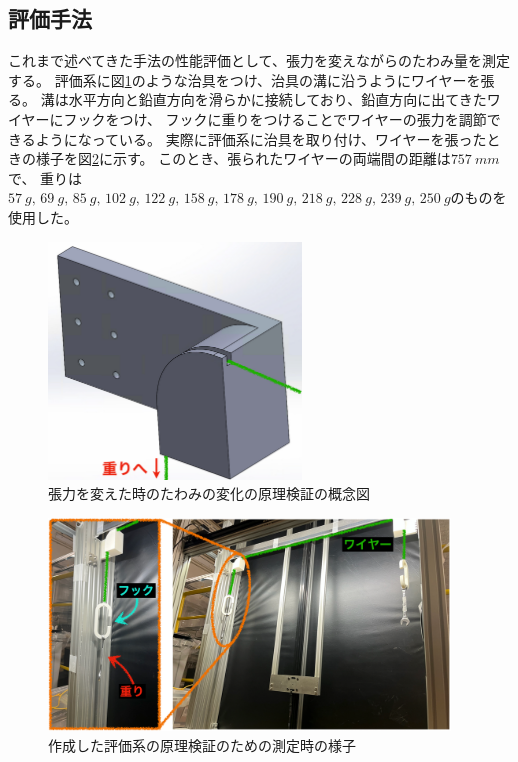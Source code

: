 \documentclass[../../main.tex]{subfiles}
\begin{document}
\subsection{評価手法}
これまで述べてきた手法の性能評価として、張力を変えながらのたわみ量を測定する。
評価系に図\ref{fig:wiresag_performance_zig}のような治具をつけ、治具の溝に沿うようにワイヤーを張る。
溝は水平方向と鉛直方向を滑らかに接続しており、鉛直方向に出てきたワイヤーにフックをつけ、
フックに重りをつけることでワイヤーの張力を調節できるようになっている。
実際に評価系に治具を取り付け、ワイヤーを張ったときの様子を図\ref{fig:wiresag_performance_cehck_system}に示す。
このとき、張られたワイヤーの両端間の距離は$\SI{757}{mm}$で、
重りは$\SI{57}{g},\,\SI{69}{g},\,\SI{85}{g},\,\SI{102}{g},\,\SI{122}{g},\,\SI{158}{g},\,\SI{178}{g},\,\SI{190}{g},\,\SI{218}{g},\,\SI{228}{g},\,\SI{239}{g},\,\SI{250}{g}$のものを使用した。
\begin{figure}[H]
    \centering
    \includegraphics[width=0.6\textwidth]{wiresag/wiresag_performance_zig.pdf}
    \caption{張力を変えた時のたわみの変化の原理検証の概念図}
    \label{fig:wiresag_performance_zig}
\end{figure}
\begin{figure}[H]
    \centering
    \includegraphics[width=0.95\textwidth]{wiresag/wiresag_performance_check_system.pdf}
    \caption{作成した評価系の原理検証のための測定時の様子}
    \label{fig:wiresag_performance_cehck_system}    
\end{figure}
\end{document}
